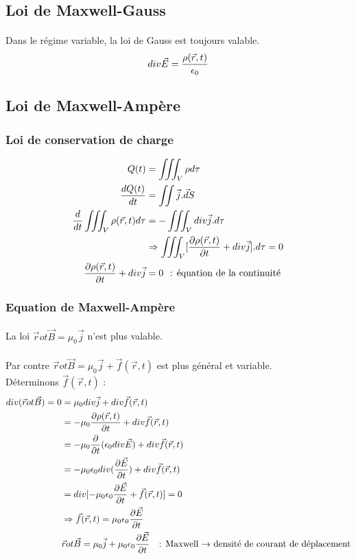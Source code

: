 \documentclass[11pt,a4paper,french]{article}
\begin{document}
\subsection{Loi de Maxwell-Gauss}
\paragraph{}
Dans le régime variable, la loi de Gauss est toujours valable.
$$div \vec E = {\rho(\vec r, t) \over \epsilon_0}$$
\subsection{Loi de Maxwell-Ampère}
\subsubsection{Loi de conservation de charge}
\begin{align*}
Q(t)&=\iiint_V \rho d \tau \\
{dQ(t) \over dt} &= \iint \vec j . \vec dS \\
{d \over dt} \iiint_V \rho(\vec r, t)d\tau &= -\iiint_V div \vec j .d\tau \\
&\Rightarrow \iiint_V [{\partial \rho (\vec r, t) \over \partial t} + div \vec j]. d\tau = 0 \\
{\partial \rho(\vec r, t) \over \partial t} + div \vec j &= 0 ~~\text{: équation de la continuité }
\end{align*}
\subsubsection{Equation de Maxwell-Ampère}
\paragraph{}
La loi $\vec rot\vec B = \mu_0 \vec j$ n'est plus valable. \\ \\
Par contre $\vec rot\vec B = \mu_0 \vec j + \vec f(\vec r, t)$ est plus général et variable. \\
Déterminons $\vec f(\vec r, t)$ :
\begin{align*}
div(\vec rot \vec B)= 0 &= \mu_0 div \vec j + div \vec f(\vec r, t) \\
&= - \mu_0 {\partial \rho(\vec r, t) \over \partial t} + div \vec f(\vec r, t) \\
&= - \mu_0 {\partial \over \partial t}(\epsilon_0 div \vec E) + div \vec f(\vec r, t) \\
&= - \mu_0 \epsilon_0 div ({\partial \vec E \over \partial t}) + div \vec f(\vec r, t) \\
&= div [-\mu_0 \epsilon_0 { \partial \vec E \over \partial t} + \vec f(\vec r, t)] = 0 \\
&\Rightarrow \vec f(\vec r, t) = \mu_0 \epsilon_0 {\partial \vec E \over \partial t} \\
& \vec rot \vec B = \mu_0 \vec j + \mu_0 \epsilon_0 {\partial \vec E \over \partial t} ~~ \text{ : Maxwell $ \rightarrow $ densité de courant de déplacement}
\end{align*}
\end{document}
